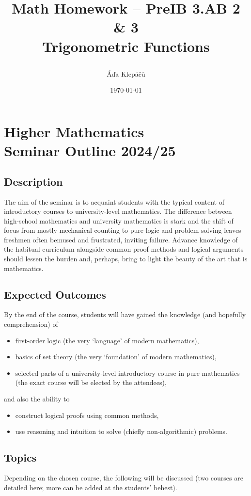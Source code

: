 \documentclass[a4paper,11pt]{article}
\title{\Huge\textsf{Math Homework -- PreIB 3.AB 2 \& 3}\\
 \Large\textsf{Trigonometric Functions}
 \author{Áďa Klepáčů}
 \date{\today}
}
\begin{document}
\section*{Higher Mathematics \\ \large\sffamily Seminar Outline 2024/25}
\thispagestyle{fancy}

\subsection*{Description}

The aim of the seminar is to acquaint students with the typical content of
introductory courses to university-level mathematics. The difference between
high-school mathematics and university mathematics is stark and the shift of
focus from mostly mechanical counting to pure logic and problem solving leaves
freshmen often bemused and frustrated, inviting failure. Advance knowledge of
the habitual curriculum alongside common proof methods and logical arguments
should lessen the burden and, perhaps, bring to light the beauty of the art that
is mathematics.

\subsection*{Expected Outcomes}
By the end of the course, students will have gained the knowledge (and hopefully
comprehension) of
\begin{itemize}
 \item first-order logic (the very `language' of modern mathematics),
 \item basics of set theory (the very `foundation' of modern mathematics),
 \item selected parts of a university-level introductory course in pure
  mathematics (the exact course will be elected by the attendees),
\end{itemize}
and also the ability to
\begin{itemize}
 \item construct logical proofs using common methods,
 \item use reasoning and intuition to solve (chiefly non-algorithmic) problems.
\end{itemize}

\subsection*{Topics}

Depending on the chosen course, the following will be discussed (two courses are
detailed here; more can be added at the students' behest).
\end{document}
